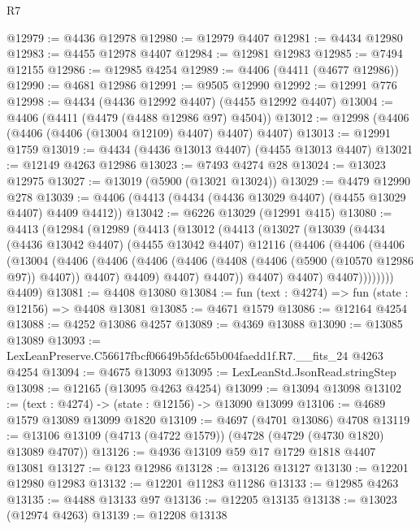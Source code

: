 \begin{lexlean}{R7}
\begin{coremodule}
@12979 := @4436 @12978
@12980 := @12979 @4407
@12981 := @4434 @12980
@12983 := @4455 @12978 @4407
@12984 := @12981 @12983
@12985 := @7494 @12155
@12986 := @12985 @4254
@12989 := @4406 (@4411 (@4677 @12986))
@12990 := @4681 @12986
@12991 := @9505 @12990
@12992 := @12991 @776
@12998 := @4434 (@4436 @12992 @4407) (@4455 @12992 @4407)
@13004 := @4406 (@4411 (@4479 (@4488 @12986 @97) @4504))
@13012 := @12998 (@4406 (@4406 (@4406 (@13004 @12109) @4407) @4407) @4407)
@13013 := @12991 @1759
@13019 := @4434 (@4436 @13013 @4407) (@4455 @13013 @4407)
@13021 := @12149 @4263 @12986
@13023 := @7493 @4274 @28
@13024 := @13023 @12975
@13027 := @13019 (@5900 (@13021 @13024))
@13029 := @4479 @12990 @278
@13039 := @4406 (@4413 (@4434 (@4436 @13029 @4407) (@4455 @13029 @4407) @4409 @4412))
@13042 := @6226 @13029 (@12991 @415)
@13080 := @4413
    (@12984
      (@12989
        (@4413
          (@13012
            (@4413
              (@13027
                (@13039
                  (@4434
                    (@4436 @13042 @4407)
                    (@4455 @13042 @4407)
                    @12116
                    (@4406
                      (@4406
                        (@4406
                          (@13004
                            (@4406
                              (@4406
                                (@4406
                                  (@4406 (@4408 (@4406 (@5900 (@10570 @12986 @97)) @4407)) @4407)
                                  @4409)
                                @4407)
                              @4407))
                          @4407)
                        @4407)
                      @4407))))))))
      @4409)
@13081 := @4408 @13080
@13084 := fun (text : @4274) => fun (state : @12156) => @4408 @13081
@13085 := @4671 @1579
@13086 := @12164 @4254
@13088 := @4252 @13086 @4257
@13089 := @4369 @13088
@13090 := @13085 @13089
@13093 := LexLeanPreserve.C56617fbcf06649b5fdc65b004faedd1f.R7.__fits_24 @4263 @4254
@13094 := @4675 @13093
@13095 := LexLeanStd.JsonRead.stringStep
@13098 := @12165 (@13095 @4263 @4254)
@13099 := @13094 @13098
@13102 := (text : @4274) -> (state : @12156) -> @13090 @13099
@13106 := @4689 @1579 @13089 @13099 @1820
@13109 := @4697 (@4701 @13086) @4708
@13119 := @13106 @13109 (@4713 (@4722 @1579)) (@4728 (@4729 (@4730 @1820) @13089 @4707))
@13126 := @4936 @13109 @59 @17 @1729 @1818 @4407 @13081
@13127 := @123 @12986
@13128 := @13126 @13127
@13130 := @12201 @12980 @12983
@13132 := @12201 @11283 @11286
@13133 := @12985 @4263
@13135 := @4488 @13133 @97
@13136 := @12205 @13135
@13138 := @13023 (@12974 @4263)
@13139 := @12208 @13138

\end{coremodule}
\end{lexlean}
